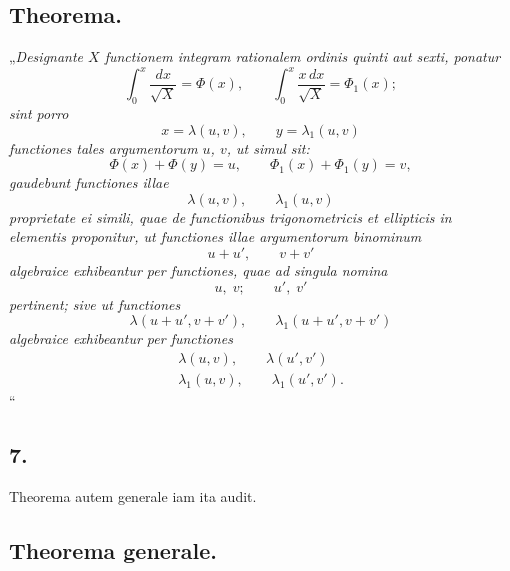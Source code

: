 \documentclass{article}
\begin{document}
\subsection*{Theorema.}

„\emph{Designante $X$ functionem integram rationalem ordinis quinti aut sexti, ponatur}
\[ \int_0^{x} \frac{dx}{\sqrt{X}} = \Phi(x), \qquad \int_0^{x} \frac{x\,dx}{\sqrt{X}} = \Phi_1(x); \]
\emph{sint porro}
\[ x = \lambda(u,v), \qquad y = \lambda_1(u,v) \]
\emph{functiones tales argumentorum $u$, $v$, ut simul sit:}
\[ \Phi(x) + \Phi(y) = u, \qquad \Phi_1(x) + \Phi_1(y) = v, \]
\emph{gaudebunt functiones illae}
\[ \lambda(u,v), \qquad \lambda_1(u,v) \]
\emph{proprietate ei simili, quae de functionibus trigonometricis et ellipticis in elementis proponitur, ut functiones illae argumentorum binominum}
\[ u + u', \qquad v + v' \]
\emph{algebraice exhibeantur per functiones, quae ad singula nomina}
\[ u, \; v; \qquad u', \; v' \]
\emph{pertinent; sive ut functiones}
\[ \lambda(u + u', v + v'), \qquad \lambda_1(u + u', v + v') \]
\emph{algebraice exhibeantur per functiones}
\[ \begin{aligned} \lambda(u,v), \qquad \lambda(u',v') \\ \lambda_1(u,v), \qquad \lambda_1(u',v'). \end{aligned} \]“

\subsection*{7.}

Theorema autem generale iam ita audit.

\subsection*{Theorema generale.}
\end{document}
